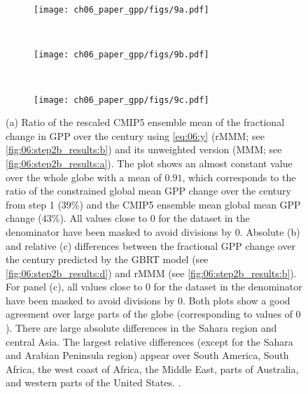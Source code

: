 \begin{figure}[!t]
  \centering
  \begin{subfigure}[b]{\SubfigureWidth{}}
    \texttt{[image: ch06\_paper\_gpp/figs/9a.pdf]}
    \caption{}
    \label{fig:06:step2b_results_biases:a}
  \end{subfigure}
  \\
  \begin{subfigure}[b]{\SubfigureWidth{}}
    \texttt{[image: ch06\_paper\_gpp/figs/9b.pdf]}
    \caption{}
    \label{fig:06:step2b_results_biases:b}
  \end{subfigure}
  ~
  \begin{subfigure}[b]{\SubfigureWidth{}}
    \texttt{[image: ch06\_paper\_gpp/figs/9c.pdf]}
    \caption{}
    \label{fig:06:step2b_results_biases:c}
  \end{subfigure}
  \caption[
    Further illustrations of our \acl{ML} approach to constrain the fractional
    change in \acf{GPP} over the  century with observations in step 2b.
  ]{
    (a) Ratio of the rescaled \acs{CMIP}5 ensemble mean of the fractional
    change in \acf{GPP} over the  century using \cref{eq:06:y}
    (r\acs{MMM}; see \cref{fig:06:step2b_results:b}) and its unweighted version
    (\acs{MMM}; see \cref{fig:06:step2b_results:a}). The plot shows an almost
    constant value over the whole globe with a mean of $0.91$, which
    corresponds to the ratio of the constrained global mean \acs{GPP} change
    over the  century from step 1 ($39 \unit{\%}$) and the \acs{CMIP}5
    ensemble mean global mean GPP change ($43 \unit{\%}$). All values close to
    $0$ for the dataset in the denominator have been masked to avoid divisions
    by $0$. Absolute (b) and relative (c) differences between the fractional
    \acs{GPP} change over the  century predicted by the \acf{GBRT}
    model (see \cref{fig:06:step2b_results:d}) and r\acs{MMM} (see
    \cref{fig:06:step2b_results:b}). For panel (c), all values close to $0$ for
    the dataset in the denominator have been masked to avoid divisions by $0$.
    Both plots show a good agreement over large parts of the globe
    (corresponding to values of $0$). There are large absolute differences in
    the Sahara region and central Asia. The largest relative differences
    (except for the Sahara and Arabian Peninsula region) appear over South
    America, South Africa, the west coast of Africa, the Middle East, parts of
    Australia, and western parts of the United States.
    .
  }
  \label{fig:06:step2b_results_biases}
\end{figure}

